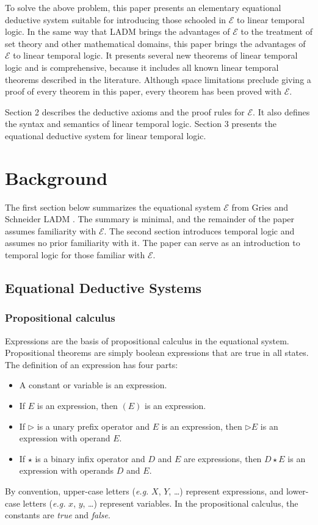 \documentclass[12pt, fleqn, leqno]{article}
\begin{document}
To solve the above problem, this paper presents an elementary equational deductive system suitable for introducing those schooled in $\mathcal{E}$ to linear temporal logic.
In the same way that LADM brings the advantages of $\mathcal{E}$ to the treatment of set theory and other mathematical domains, this paper brings the advantages of $\mathcal{E}$ to linear temporal logic.
It presents several new theorems of linear temporal logic and is comprehensive, because it includes all known linear temporal theorems described in the literature.
Although space limitations preclude giving a proof of every theorem in this paper, every theorem has been proved with $\mathcal{E}$.

Section 2 describes the deductive axioms and the proof rules for $\mathcal{E}$.
It also defines the syntax and semantics of linear temporal logic.
Section 3 presents the equational deductive system for linear temporal logic.

\section{Background}

The first section below summarizes the equational system $\mathcal{E}$ from Gries and Schneider LADM \cite{LADM}.
The summary is minimal, and the remainder of the paper assumes familiarity with $\mathcal{E}$.
The second section introduces temporal logic and assumes no prior familiarity with it.
The paper can serve as an introduction to temporal logic for those familiar with $\mathcal{E}$.

\subsection{Equational Deductive Systems}

\subsubsection*{Propositional calculus}

Expressions are the basis of propositional calculus in the equational system.
Propositional theorems are simply boolean expressions that are true in all states.
The definition of an expression has four parts:
\begin{itemize}[$\bullet$]
\item A constant or variable is an expression.
\item If $E$ is an expression, then $(E)$ is an expression.
\item If $\triangleright$ is a unary prefix operator and $E$ is an expression, then $\triangleright E$ is an expression with operand $E$.
\item If $\star$ is a binary infix operator and $D$ and $E$ are expressions, then $D \star E$ is an expression with operands $D$
and $E$.
\end{itemize}
By convention, upper-case letters ({\itshape e.g.\/} $X$, $Y$, \dots) represent expressions,
and lower-case letters ({\itshape e.g.\/} $x$, $y$, \dots) represent variables.
In the propositional calculus, the constants are {\itshape true\/} and {\itshape false\/}.
\end{document}
